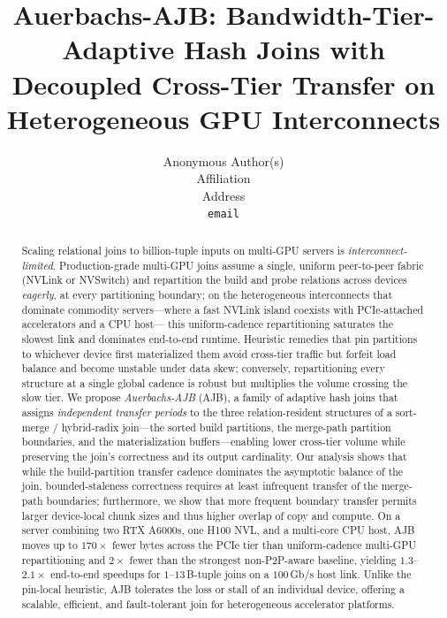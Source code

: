 \documentclass{article}
\title{Auerbachs-AJB: Bandwidth-Tier-Adaptive Hash Joins with
Decoupled Cross-Tier Transfer on Heterogeneous GPU Interconnects}
\author{%
  Anonymous Author(s)\\
  Affiliation\\
  Address\\
  \texttt{email}%
}
\begin{document}
\maketitle

\begin{abstract}
Scaling relational joins to billion-tuple inputs on multi-GPU servers is
\emph{interconnect-limited}. Production-grade multi-GPU joins assume a single,
uniform peer-to-peer fabric (NVLink or NVSwitch) and repartition the build and
probe relations across devices \emph{eagerly}, at every partitioning boundary;
on the heterogeneous interconnects that dominate commodity servers---where a
fast NVLink island coexists with PCIe-attached accelerators and a CPU host---
this uniform-cadence repartitioning saturates the slowest link and dominates
end-to-end runtime. Heuristic remedies that pin partitions to whichever device
first materialized them avoid cross-tier traffic but forfeit load balance and
become unstable under data skew; conversely, repartitioning every structure at a
single global cadence is robust but multiplies the volume crossing the slow tier.
We propose \emph{Auerbachs-AJB} (AJB), a family of adaptive hash joins that
assigns \emph{independent transfer periods} to the three relation-resident
structures of a sort-merge / hybrid-radix join---the sorted build partitions,
the merge-path partition boundaries, and the materialization buffers---enabling
lower cross-tier volume while preserving the join's correctness and its
output cardinality. Our analysis shows that while the build-partition transfer
cadence dominates the asymptotic balance of the join, bounded-staleness
correctness requires at least infrequent transfer of the merge-path boundaries;
furthermore, we show that more frequent boundary transfer permits larger
device-local chunk sizes and thus higher overlap of copy and compute. On a
server combining two RTX A6000s, one H100 NVL, and a multi-core CPU host, AJB
moves up to $170\times$ fewer bytes across the PCIe tier than uniform-cadence
multi-GPU repartitioning and $2\times$ fewer than the strongest non-P2P-aware
baseline, yielding $1.3$--$2.1\times$ end-to-end speedups for $1$--$13$\,B-tuple
joins on a $100$\,Gb/s host link. Unlike the pin-local heuristic, AJB tolerates
the loss or stall of an individual device, offering a scalable, efficient, and
fault-tolerant join for heterogeneous accelerator platforms.
\end{abstract}
\end{document}

